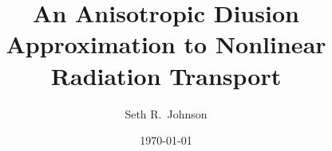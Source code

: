 \let\origmaketitle\maketitle
\renewcommand\maketitle\relax
\renewcommand\contentsname\relax

\author{Seth R.~Johnson}
\title{An Anisotropic Diusion Approximation to Nonlinear Radiation Transport}
\date{\today}

\usepackage{color}


\makeatletter
\newcommand{\newchapter}{%
\noindent%
\hspace{\stretch{1}}%
\colorbox{intertextbg}{\parbox{0.75\columnwidth}{\centering Chapter from Seth's
dissertation}}%
\hspace{\stretch{1}}
}
\makeatother

\newcommand{\chapter}[1]{%
\title{#1}%
\origmaketitle
\newchapter
{\par\noindent\centering\rule[.25ex]{\columnwidth}{2pt}\par}%
\vspace{-3\baselineskip}
\tableofcontents%
{\par\noindent\centering\rule[.25ex]{\columnwidth}{2pt}\par}%
\clearpage%
}

\graphicspath{{/Users/seth/_research/figures/}}
\makeatletter
{}
\makeatother

\newcommand{\prelistpar}{}

\usepackage{booktabs} %
\usepackage{rotating}

